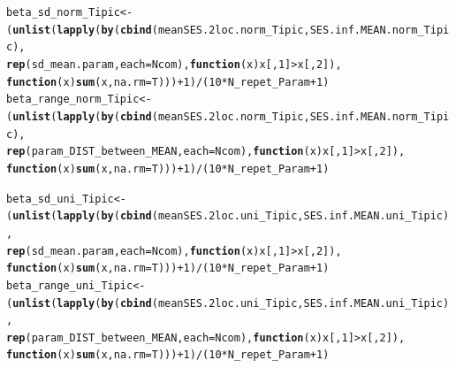 \documentclass[12pt]{article}\usepackage[]{graphicx}\usepackage[]{color}
\makeatletter
\newcommand{\hlnum}[1]{\textcolor[rgb]{0.686,0.059,0.569}{#1}}%
\newcommand{\hlopt}[1]{\textcolor[rgb]{0,0,0}{#1}}%
\newcommand{\hlstd}[1]{\textcolor[rgb]{0.345,0.345,0.345}{#1}}%
\newcommand{\hlkwa}[1]{\textcolor[rgb]{0.161,0.373,0.58}{\textbf{#1}}}%
\newcommand{\hlkwb}[1]{\textcolor[rgb]{0.69,0.353,0.396}{#1}}%
\newcommand{\hlkwc}[1]{\textcolor[rgb]{0.333,0.667,0.333}{#1}}%
\newcommand{\hlkwd}[1]{\textcolor[rgb]{0.737,0.353,0.396}{\textbf{#1}}}%
\newenvironment{kframe}{%
 \def\at@end@of@kframe{}%
 \ifinner\ifhmode%
  \def\at@end@of@kframe{\end{minipage}}%
  \begin{minipage}{\columnwidth}%
 \fi\fi%
 \def\FrameCommand##1{\hskip\@totalleftmargin \hskip-\fboxsep
 \colorbox{shadecolor}{##1}\hskip-\fboxsep
     \hskip-\linewidth \hskip-\@totalleftmargin \hskip\columnwidth}%
 \MakeFramed {\advance\hsize-\width
   \@totalleftmargin\z@ \linewidth\hsize
   \@setminipage}}%
 {\par\unskip\endMakeFramed%
 \at@end@of@kframe}
\newenvironment{knitrout}{}{} %
\makeatother
\begin{document}
\begin{landscape}
\begin{knitrout}\small
{}\color{fgcolor}\begin{kframe}
\begin{alltt}
\hlstd{beta_sd_norm_Tipic} \hlkwb{<-}
 \hlstd{(}\hlkwd{unlist}\hlstd{(}\hlkwd{lapply}\hlstd{(}\hlkwd{by}\hlstd{(}\hlkwd{cbind}\hlstd{(meanSES.2loc.norm_Tipic, SES.inf.MEAN.norm_Tipic),}
     \hlkwd{rep}\hlstd{(sd_mean.param,} \hlkwc{each} \hlstd{= Ncom),} \hlkwa{function}\hlstd{(}\hlkwc{x}\hlstd{) x[,}\hlnum{1}\hlstd{]} \hlopt{>} \hlstd{x[,}\hlnum{2}\hlstd{]),}
     \hlkwa{function}\hlstd{(}\hlkwc{x}\hlstd{)} \hlkwd{sum}\hlstd{(x,} \hlkwc{na.rm} \hlstd{= T)))}\hlopt{+}\hlnum{1}\hlstd{)}\hlopt{/}\hlstd{(}\hlnum{10} \hlopt{*} \hlstd{N_repet_Param} \hlopt{+} \hlnum{1}\hlstd{)}
\hlstd{beta_range_norm_Tipic} \hlkwb{<-}
 \hlstd{(}\hlkwd{unlist}\hlstd{(}\hlkwd{lapply}\hlstd{(}\hlkwd{by}\hlstd{(}\hlkwd{cbind}\hlstd{(meanSES.2loc.norm_Tipic, SES.inf.MEAN.norm_Tipic),}
     \hlkwd{rep}\hlstd{(param_DIST_between_MEAN,} \hlkwc{each} \hlstd{= Ncom),} \hlkwa{function}\hlstd{(}\hlkwc{x}\hlstd{) x[,}\hlnum{1}\hlstd{]} \hlopt{>} \hlstd{x[,}\hlnum{2}\hlstd{]),}
     \hlkwa{function}\hlstd{(}\hlkwc{x}\hlstd{)} \hlkwd{sum}\hlstd{(x,} \hlkwc{na.rm} \hlstd{= T)))}\hlopt{+}\hlnum{1}\hlstd{)}\hlopt{/}\hlstd{(}\hlnum{10} \hlopt{*} \hlstd{N_repet_Param} \hlopt{+} \hlnum{1}\hlstd{)}

\hlstd{beta_sd_uni_Tipic} \hlkwb{<-}
 \hlstd{(}\hlkwd{unlist}\hlstd{(}\hlkwd{lapply}\hlstd{(}\hlkwd{by}\hlstd{(}\hlkwd{cbind}\hlstd{(meanSES.2loc.uni_Tipic, SES.inf.MEAN.uni_Tipic),}
     \hlkwd{rep}\hlstd{(sd_mean.param,} \hlkwc{each} \hlstd{= Ncom),} \hlkwa{function}\hlstd{(}\hlkwc{x}\hlstd{) x[,}\hlnum{1}\hlstd{]} \hlopt{>} \hlstd{x[,}\hlnum{2}\hlstd{]),}
     \hlkwa{function}\hlstd{(}\hlkwc{x}\hlstd{)} \hlkwd{sum}\hlstd{(x,} \hlkwc{na.rm} \hlstd{= T)))}\hlopt{+}\hlnum{1}\hlstd{)}\hlopt{/}\hlstd{(}\hlnum{10} \hlopt{*} \hlstd{N_repet_Param} \hlopt{+} \hlnum{1}\hlstd{)}
\hlstd{beta_range_uni_Tipic} \hlkwb{<-}
 \hlstd{(}\hlkwd{unlist}\hlstd{(}\hlkwd{lapply}\hlstd{(}\hlkwd{by}\hlstd{(}\hlkwd{cbind}\hlstd{(meanSES.2loc.uni_Tipic, SES.inf.MEAN.uni_Tipic),}
     \hlkwd{rep}\hlstd{(param_DIST_between_MEAN,} \hlkwc{each} \hlstd{= Ncom),} \hlkwa{function}\hlstd{(}\hlkwc{x}\hlstd{) x[,}\hlnum{1}\hlstd{]} \hlopt{>} \hlstd{x[,}\hlnum{2}\hlstd{]),}
     \hlkwa{function}\hlstd{(}\hlkwc{x}\hlstd{)} \hlkwd{sum}\hlstd{(x,} \hlkwc{na.rm} \hlstd{= T)))}\hlopt{+}\hlnum{1}\hlstd{)}\hlopt{/}\hlstd{(}\hlnum{10} \hlopt{*} \hlstd{N_repet_Param} \hlopt{+} \hlnum{1}\hlstd{)}


\end{alltt}
\end{kframe}
\end{knitrout}
\end{landscape}
\end{document}
